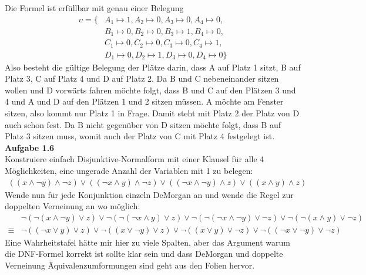\documentclass[a4paper,10pt]{article}
\begin{document}
Die Formel ist erfüllbar mit genau einer Belegung 
\begin{align*}
\upsilon = \{ & A_1 \mapsto 1, A_2 \mapsto 0, A_3 \mapsto 0, A_4 \mapsto 0, \\
& B_1 \mapsto 0, B_2 \mapsto 0, B_3 \mapsto 1, B_4 \mapsto 0, \\ 
& C_1 \mapsto 0, C_2 \mapsto 0, C_3 \mapsto 0, C_4 \mapsto 1, \\
& D_1 \mapsto 0, D_2 \mapsto 1, D_3 \mapsto 0, D_4 \mapsto 0 \}
\end{align*}
Also besteht die gültige Belegung der Plätze darin, dass A auf Platz 1 sitzt, B auf Platz 3, C auf Platz 4 und D auf Platz 2. Da B und C nebeneinander sitzen wollen und D vorwärts fahren möchte folgt, dass B und C auf den Plätzen 3 und 4 und A und D auf den Plätzen 1 und 2 sitzen müssen. A möchte am Fenster sitzen, also kommt nur Platz 1 in Frage. Damit steht mit Platz 2 der Platz von D auch schon fest. Da B nicht gegenüber von D sitzen möchte folgt, dass B auf Platz 3 sitzen muss, womit auch der Platz von C mit Platz 4 festgelegt ist.\\


\noindent\textbf{Aufgabe 1.6}\\
Konstruiere einfach Disjunktive-Normalform mit einer Klausel für alle 4 Möglichkeiten, eine ungerade Anzahl der Variablen mit 1 zu belegen:
\begin{align*}
((x \wedge \neg y) \wedge \neg z) \vee ((\neg x \wedge y) \wedge \neg z) \vee ((\neg x \wedge \neg y) \wedge z) \vee ((x \wedge y) \wedge z) 
\end{align*}
Wende nun für jede Konjunktion einzeln DeMorgan an und wende die Regel zur doppelten Verneinung an wo möglich:
\begin{align*}
& \neg (\neg(x \wedge \neg y) \vee z) \vee \neg(\neg(\neg x \wedge y) \vee z) \vee \neg(\neg(\neg x \wedge \neg y) \vee \neg z) \vee \neg (\neg(x \wedge y) \vee \neg z) \\ 
\equiv & \neg ((\neg x \vee y) \vee z) \vee \neg((x \vee \neg y) \vee z) \vee \neg((x \vee y) \vee \neg z) \vee \neg ((\neg x \vee \neg y) \vee \neg z)
\end{align*}
Eine Wahrheitstafel hätte mir hier zu viele Spalten, aber das Argument warum die DNF-Formel korrekt ist sollte klar sein und dass DeMorgan und doppelte Verneinung Äquivalenzumformungen sind geht aus den Folien hervor.
\end{document}
